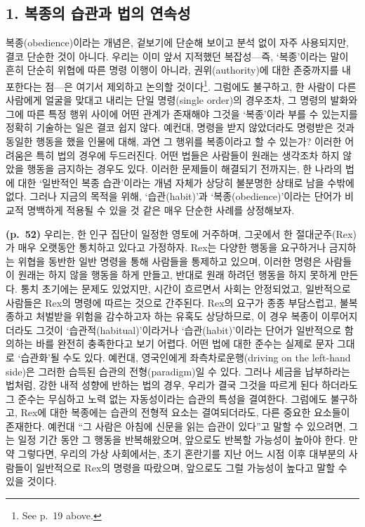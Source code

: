\subsection{1. 복종의 습관과 법의
연속성}\label{uxbcf5uxc885uxc758-uxc2b5uxad00uxacfc-uxbc95uxc758-uxc5f0uxc18duxc131}

복종(obedience)이라는 개념은, 겉보기에 단순해 보이고 분석 없이 자주
사용되지만, 결코 단순한 것이 아니다. 우리는 이미 앞서 지적했던
복잡성---즉, `복종'이라는 말이 흔히 단순히 위협에 따른 명령 이행이
아니라, 권위(authority)에 대한 존중까지를 내포한다는 점---은 여기서
제외하고 논의할 것이다\footnote{See p.~19 above.}. 그럼에도 불구하고, 한
사람이 다른 사람에게 얼굴을 맞대고 내리는 단일 명령(single order)의
경우조차, 그 명령의 발화와 그에 따른 특정 행위 사이에 어떤 관계가
존재해야 그것을 `복종'이라 부를 수 있는지를 정확히 기술하는 일은 결코
쉽지 않다. 예컨대, 명령을 받지 않았더라도 명령받은 것과 동일한 행동을
했을 인물에 대해, 과연 그 행위를 복종이라고 할 수 있는가? 이러한
어려움은 특히 법의 경우에 두드러진다. 어떤 법들은 사람들이 원래는
생각조차 하지 않았을 행동을 금지하는 경우도 있다. 이러한 문제들이
해결되기 전까지는, 한 나라의 법에 대한 `일반적인 복종 습관'이라는 개념
자체가 상당히 불분명한 상태로 남을 수밖에 없다. 그러나 지금의 목적을
위해, `습관(habit)'과 `복종(obedience)'이라는 단어가 비교적 명백하게
적용될 수 있을 것 같은 매우 단순한 사례를 상정해보자.

\textbf{(p.~52)} 우리는, 한 인구 집단이 일정한 영토에 거주하며, 그곳에서
한 절대군주(Rex)가 매우 오랫동안 통치하고 있다고 가정하자. Rex는 다양한
행동을 요구하거나 금지하는 위협을 동반한 일반 명령을 통해 사람들을
통제하고 있으며, 이러한 명령은 사람들이 원래는 하지 않을 행동을 하게
만들고, 반대로 원래 하려던 행동을 하지 못하게 만든다. 통치 초기에는
문제도 있었지만, 시간이 흐르면서 사회는 안정되었고, 일반적으로 사람들은
Rex의 명령에 따르는 것으로 간주된다. Rex의 요구가 종종 부담스럽고,
불복종하고 처벌받을 위험을 감수하고자 하는 유혹도 상당하므로, 이 경우
복종이 이루어지더라도 그것이 `습관적(habitual)'이라거나
`습관(habit)'이라는 단어가 일반적으로 함의하는 바를 완전히 충족한다고
보기 어렵다. 어떤 법에 대한 준수는 실제로 문자 그대로 `습관화'될 수도
있다. 예컨대, 영국인에게 좌측차로운행(driving on the left-hand side)은
그러한 습득된 습관의 전형(paradigm)일 수 있다. 그러나 세금을 납부하라는
법처럼, 강한 내적 성향에 반하는 법의 경우, 우리가 결국 그것을 따르게
된다 하더라도 그 준수는 무심하고 노력 없는 자동성이라는 습관의 특성을
결여한다. 그럼에도 불구하고, Rex에 대한 복종에는 습관의 전형적 요소는
결여되더라도, 다른 중요한 요소들이 존재한다. 예컨대 ``그 사람은 아침에
신문을 읽는 습관이 있다''고 말할 수 있으려면, 그는 일정 기간 동안 그
행동을 반복해왔으며, 앞으로도 반복할 가능성이 높아야 한다. 만약
그렇다면, 우리의 가상 사회에서는, 초기 혼란기를 지난 어느 시점 이후
대부분의 사람들이 일반적으로 Rex의 명령을 따랐으며, 앞으로도 그럴
가능성이 높다고 말할 수 있을 것이다.

